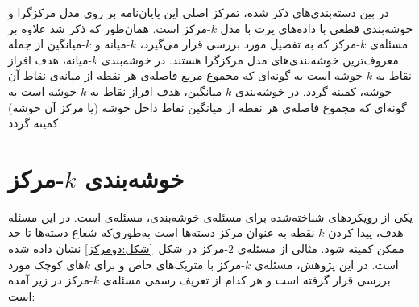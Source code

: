 در بین دسته‌بندی‌های ذکر شده، تمرکز اصلی این پایان‌نامه بر روی مدل مرکزگرا و خوشه‌بندی قطعی با داده‌های پرت با مدل $k$-مرکز است.
همان‌طور که ذکر شد علاوه بر مسئله‌ی $k$-مرکز که به تفصیل مورد بررسی قرار می‌گیرد، $k$-میانه و $k$-میانگین از جمله معروف‌ترین خوشه‌بندی‌های مدل مرکزگرا هستند.
در خوشه‌بندی $k$-میانه، هدف افراز نقاط به $k$ خوشه است به گونه‌ای که مجموع مربع فاصله‌ی هر نقطه از میانه‌ی نقاط آن خوشه، کمینه گردد.
در خوشه‌بندی $k$-میانگین، هدف افراز نقاط به $k$ خوشه است به گونه‌ای که مجموع فاصله‌ی هر نقطه از میانگین نقاط داخل خوشه (یا مرکز آن خوشه) کمینه گردد.

\section{خوشه‌بندی $k$-مرکز}




یکی از رویکردهای شناخته‌شده برای مسئله‌ی خوشه‌بندی، مسئله‌ی  است.
در این مسئله هدف، پیدا کردن $k$ نقطه به عنوان مرکز دسته‌ها است به‌طوری‌که شعاع دسته‌ها تا حد ممکن کمینه شود.
مثالی از مسئله‌ی $2$-مرکز در شکل~\ref{شکل:دومرکز} نشان داده شده است.
در این پژوهش، مسئله‌ی $k$-مرکز با متریک‌های خاص و برای $k$های کوچک مورد بررسی قرار گرفته است و هر کدام از‌ تعریف رسمی مسئله‌ی $k$-مرکز در زیر آمده است:

